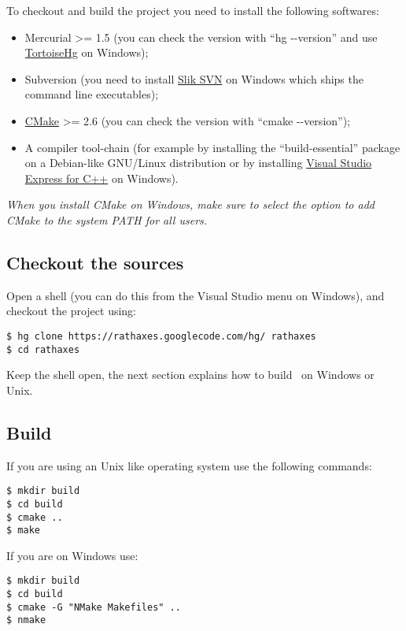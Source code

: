 \documentclass[american]{rtxarticle}
\begin{document}
To checkout and build the project you need to install the following softwares:
\begin{itemize}
\item Mercurial >= 1.5 (you can check the version with ``hg {-}{-}version'' and
      use \href{http://tortoisehg.bitbucket.org/download/index.html}{TortoiseHg}
      on Windows);
\item Subversion (you need to install \href{http://www.sliksvn.com/en/download}{Slik
      SVN} on Windows which ships the command line executables);
\item \href{http://www.cmake.org/cmake/resources/software.html}{CMake} >= 2.6
      (you can check the version with ``cmake {-}{-}version'');
\item A compiler tool-chain (for example by installing the ``build-essential'' package on a
      Debian-like GNU/Linux distribution or by installing
      \href{http://www.microsoft.com/express/Downloads/#2010-Visual-CPP}{Visual Studio Express for C++}
      on Windows).
\end{itemize}

\emph{When you install CMake on Windows, make sure to select the option to add
CMake to the system PATH for all users.}

\subsection{Checkout the sources}

Open a shell (you can do this from the Visual Studio menu on Windows), and
checkout the project using:

\begin{lstlisting}
$ hg clone https://rathaxes.googlecode.com/hg/ rathaxes
$ cd rathaxes
\end{lstlisting}

Keep the shell open, the next section explains how to build \rtx\ on Windows or
Unix.

\subsection{Build \rtx}

If you are using an Unix like operating system use the following commands:

\begin{lstlisting}
$ mkdir build
$ cd build
$ cmake ..
$ make
\end{lstlisting}

If you are on Windows use:

\begin{lstlisting}
$ mkdir build
$ cd build
$ cmake -G "NMake Makefiles" ..
$ nmake
\end{lstlisting}

\rtxmaketitleblock
\end{document}
